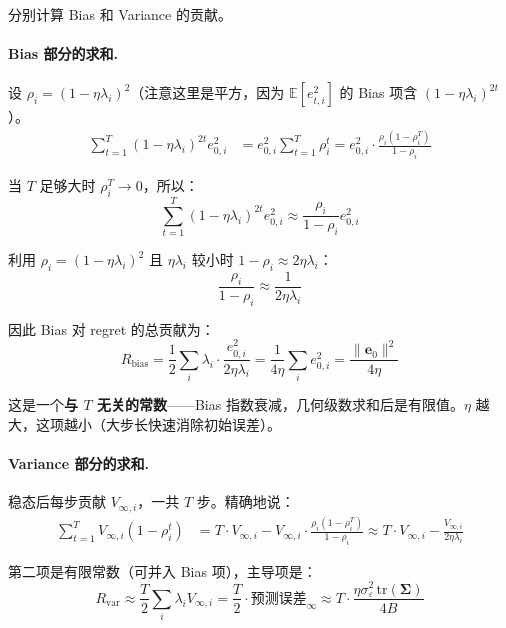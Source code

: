\documentclass[12pt, a4paper]{ctexart}
\begin{document}
分别计算 Bias 和 Variance 的贡献。

\paragraph{Bias 部分的求和.}

设 $\rho_i = (1-\eta\lambda_i)^2$（注意这里是平方，因为 $\mathbb{E}[e_{t,i}^2]$ 的 Bias 项含 $(1-\eta\lambda_i)^{2t}$）。
\begin{align}
    \sum_{t=1}^T (1-\eta\lambda_i)^{2t} e_{0,i}^2 &= e_{0,i}^2 \sum_{t=1}^T \rho_i^t = e_{0,i}^2 \cdot \frac{\rho_i(1 - \rho_i^T)}{1 - \rho_i}
\end{align}

当 $T$ 足够大时 $\rho_i^T \to 0$，所以：
\begin{equation}
    \sum_{t=1}^T (1-\eta\lambda_i)^{2t} e_{0,i}^2 \approx \frac{\rho_i}{1 - \rho_i} e_{0,i}^2
\end{equation}

利用 $\rho_i = (1-\eta\lambda_i)^2$ 且 $\eta\lambda_i$ 较小时 $1 - \rho_i \approx 2\eta\lambda_i$：
\begin{equation}
    \frac{\rho_i}{1-\rho_i} \approx \frac{1}{2\eta\lambda_i}
\end{equation}

因此 Bias 对 regret 的总贡献为：
\begin{equation}
    R_{\text{bias}} = \frac{1}{2}\sum_i \lambda_i \cdot \frac{e_{0,i}^2}{2\eta\lambda_i} = \frac{1}{4\eta}\sum_i e_{0,i}^2 = \frac{\|\mathbf{e}_0\|^2}{4\eta}
\end{equation}

这是一个\textbf{与 $T$ 无关的常数}——Bias 指数衰减，几何级数求和后是有限值。$\eta$ 越大，这项越小（大步长快速消除初始误差）。

\paragraph{Variance 部分的求和.}

稳态后每步贡献 $V_{\infty,i}$，一共 $T$ 步。精确地说：
\begin{align}
    \sum_{t=1}^T V_{\infty,i}(1 - \rho_i^t) &= T \cdot V_{\infty,i} - V_{\infty,i} \cdot \frac{\rho_i(1-\rho_i^T)}{1-\rho_i} \approx T \cdot V_{\infty,i} - \frac{V_{\infty,i}}{2\eta\lambda_i}
\end{align}

第二项是有限常数（可并入 Bias 项），主导项是：
\begin{equation}
    R_{\text{var}} \approx \frac{T}{2}\sum_i \lambda_i V_{\infty,i} = \frac{T}{2} \cdot \text{预测误差}_\infty \approx T \cdot \frac{\eta\sigma_\varepsilon^2\,\text{tr}(\boldsymbol{\Sigma})}{4B}
\end{equation}
\end{document}
